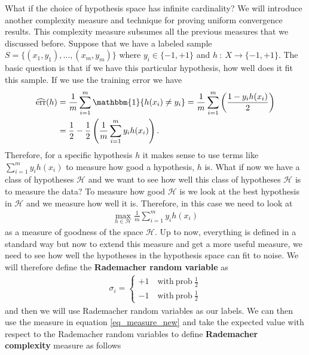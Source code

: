 \documentclass[10pt ]{article}
\begin{document}
What if the choice of hypothesis space has infinite cardinality? We will introduce another complexity measure and technique for proving uniform convergence results. This complexity measure subsumes all the previous measures that we discussed before. Suppose that we have a labeled sample $S = \{(x_1, y_1),\dots,(x_m,y_m)\}$ where $y_i \in \{-1, +1\}$ and $h ~:~ X \to  \{-1, +1\}$. The basic question is that if we have this particular hypothesis, how well does it fit this sample. If we use the training error we have 
\begin{align}
\widehat{\mathrm{err}}(h) &= \frac{1}{m} \sum_{i=1}^m \mathbbm{1}\{h(x_i) \neq y_i \} = \frac{1}{m} \sum_{i=1}^m \left( \frac{1-y_i h(x_i)}{2} \right) \nonumber \\
&= \frac{1}{2} - \frac{1}{2} \left( \frac{1}{m} \sum_{i=1}^m y_i h(x_i)\right).
\end{align}
Therefore, for a specific hypothesis $h$ it makes sense to use terms like $\sum_{i=1}^m y_i h(x_i)$ to measure how good a hypothesis, $h$ is. What if now we have a class of hypotheses $\mathcal{H}$ and we want to see how well this class of hypotheses $\mathcal{H}$ is to measure the data? To measure how good $\mathcal{H}$ is we look at the best hypothesis in $\mathcal{H}$ and we measure how well it is. Therefore, in this case we need to look at 
\begin{align}
\max_{h \in \mathcal{H}}  \frac{1}{m} \sum_{i=1}^m y_i h(x_i)
\label{eq_measure_new}
\end{align}
as a measure of goodness of the space $\mathcal{H}$. Up to now, everything is defined in a standard way but now to extend this measure and get a more useful measure, we need to see how well the hypotheses in the hypothesis space can fit to noise. We will therefore define the \textbf{Rademacher random variable} as 
\begin{align}
\sigma_i = \left\{ \begin{array}{ll}
                   +1 \quad  \mathrm{with~prob~} \frac{1}{2}\\
                   -1 \quad  \mathrm{with~prob~} \frac{1}{2}
                      \end{array}   
                    \right.  
\label{eq_rademacher_var}
\end{align}
and then we will use Rademacher random variables as our labels. We can then use the measure in equation \eqref{eq_measure_new} and take the expected value with respect to the Rademacher random variables to define \textbf{Rademacher complexity} measure as follows 
\end{document}
